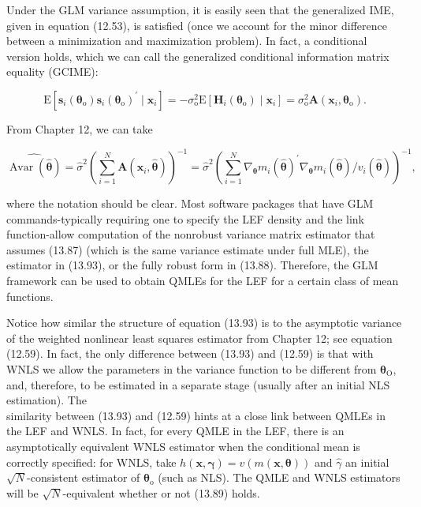 \documentclass[10pt]{article}
\begin{document}
Under the GLM variance assumption, it is easily seen that the generalized IME, given in equation (12.53), is satisfied (once we account for the minor difference between a minimization and maximization problem). In fact, a conditional version holds, which we can call the generalized conditional information matrix equality (GCIME):


\begin{equation*}
\mathrm{E}\left[\mathbf{s}_{i}\left(\boldsymbol{\theta}_{\mathrm{o}}\right) \mathbf{s}_{i}\left(\boldsymbol{\theta}_{\mathrm{o}}\right)^{\prime} \mid \mathbf{x}_{i}\right]=-\sigma_{\mathrm{o}}^{2} \mathrm{E}\left[\mathbf{H}_{i}\left(\boldsymbol{\theta}_{\mathrm{o}}\right) \mid \mathbf{x}_{i}\right]=\sigma_{\mathrm{o}}^{2} \mathbf{A}\left(\mathbf{x}_{i}, \boldsymbol{\theta}_{\mathrm{o}}\right) . \tag{13.92}
\end{equation*}


From Chapter 12, we can take


\begin{equation*}
\widehat{\operatorname{Avar}(\hat{\boldsymbol{\theta}})}=\hat{\sigma}^{2}\left(\sum_{i=1}^{N} \mathbf{A}\left(\mathbf{x}_{i}, \hat{\boldsymbol{\theta}}\right)\right)^{-1}=\hat{\sigma}^{2}\left(\sum_{i=1}^{N} \nabla_{\boldsymbol{\theta}} m_{i}(\hat{\boldsymbol{\theta}})^{\prime} \nabla_{\boldsymbol{\theta}} m_{i}(\hat{\boldsymbol{\theta}}) / v_{i}(\hat{\boldsymbol{\theta}})\right)^{-1}, \tag{13.93}
\end{equation*}


where the notation should be clear. Most software packages that have GLM commands-typically requiring one to specify the LEF density and the link function-allow computation of the nonrobust variance matrix estimator that assumes (13.87) (which is the same variance estimate under full MLE), the estimator in (13.93), or the fully robust form in (13.88). Therefore, the GLM framework can be used to obtain QMLEs for the LEF for a certain class of mean functions.

Notice how similar the structure of equation (13.93) is to the asymptotic variance of the weighted nonlinear least squares estimator from Chapter 12; see equation (12.59). In fact, the only difference between (13.93) and (12.59) is that with WNLS we allow the parameters in the variance function to be different from $\boldsymbol{\theta}_{\mathrm{O}}$, and, therefore, to be estimated in a separate stage (usually after an initial NLS estimation). The\\
similarity between (13.93) and (12.59) hints at a close link between QMLEs in the LEF and WNLS. In fact, for every QMLE in the LEF, there is an asymptotically equivalent WNLS estimator when the conditional mean is correctly specified: for WNLS, take $h(\mathbf{x}, \boldsymbol{\gamma})=v(m(\mathbf{x}, \boldsymbol{\theta}))$ and $\hat{\gamma}$ an initial $\sqrt{N}$-consistent estimator of $\boldsymbol{\theta}_{\mathrm{o}}$ (such as NLS). The QMLE and WNLS estimators will be $\sqrt{N}$-equivalent whether or not (13.89) holds.
\end{document}

